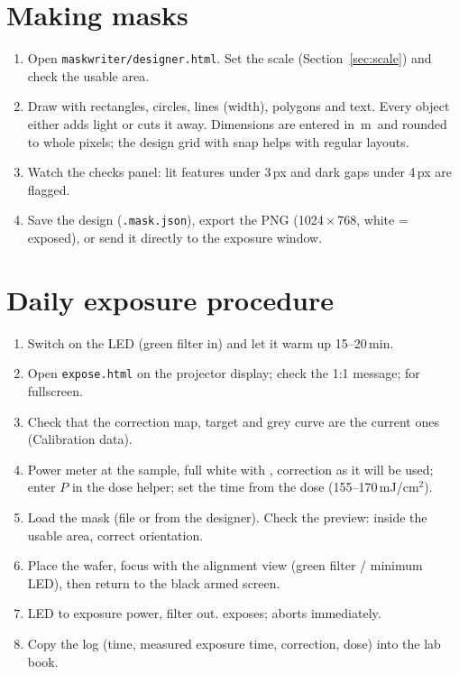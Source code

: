 \documentclass[11pt,a4paper]{article}
\newcommand{\um}{\,\textmu m}
\newcommand{\key}[1]{\fbox{\footnotesize\texttt{#1}}}
\newcommand{\file}[1]{\texttt{#1}}
\begin{document}
\section{Making masks}
\begin{enumerate}
  \item Open \file{maskwriter/designer.html}. Set the scale (Section~\ref{sec:scale}) and check the usable area.
  \item Draw with rectangles, circles, lines (width), polygons and text. Every object either adds light or cuts it away.
        Dimensions are entered in \um\ and rounded to whole pixels; the design grid with snap helps with regular
        layouts.
  \item Watch the checks panel: lit features under 3\,px and dark gaps under 4\,px are flagged.
  \item Save the design (\file{.mask.json}), export the PNG (1024\,$\times$\,768, white = exposed), or send it
        directly to the exposure window.
\end{enumerate}

\section{Daily exposure procedure}
\begin{enumerate}
  \item Switch on the LED (green filter in) and let it warm up 15--20\,min.
  \item Open \file{expose.html} on the projector display; check the 1:1 message; \key{F} for fullscreen.
  \item Check that the correction map, target and grey curve are the current ones (Calibration data).
  \item Power meter at the sample, full white with \key{W}, correction as it will be used; enter $P$ in the dose helper;
        set the time from the dose (155--170\,mJ/cm$^2$).
  \item Load the mask (file or from the designer). Check the preview: inside the usable area, correct orientation.
  \item Place the wafer, focus with the alignment view \key{O} (green filter / minimum LED), then return to the black
        armed screen.
  \item LED to exposure power, filter out. \key{Space} exposes; \key{Esc} aborts immediately.
  \item Copy the log (time, measured exposure time, correction, dose) into the lab book.
\end{enumerate}
\end{document}
